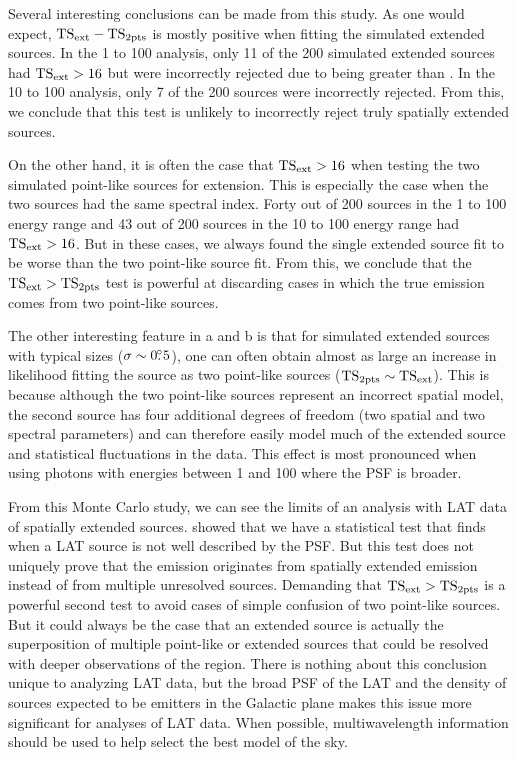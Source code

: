 Several interesting conclusions can be made from this study.  As one would
expect, $\mathrm{TS}_\mathrm{ext}-\mathrm{TS}_{\mathrm{2pts}}$ is mostly positive when fitting the simulated
extended sources.  In the 1 \gev to 100 \gev analysis, only 11 of the
200 simulated extended sources had $\mathrm{TS}_\mathrm{ext}>16$ but were incorrectly
rejected due to \tsinc being greater than \tsext.  In the 10 \gev to 100
\gev analysis, only 7 of the 200 sources were incorrectly rejected. From
this, we conclude that this test is unlikely to incorrectly reject truly
spatially extended sources.

On the other hand, it is often the case that $\mathrm{TS}_\mathrm{ext}>16$ when testing
the two simulated point-like sources for extension.  This is especially
the case when the two sources had the same spectral index. Forty out
of 200 sources in the 1 \gev to 100 \gev energy range and 43 out of
200 sources in the 10 \gev to 100 \gev energy range had $\mathrm{TS}_\mathrm{ext}>16$.
But in these cases, we always found the single extended source fit to
be worse than the two point-like source fit.  From this, we conclude
that the $\mathrm{TS}_\mathrm{ext}>\mathrm{TS}_{\mathrm{2pts}}$ test is powerful at discarding cases in which
the true emission comes from two point-like sources.

The other interesting feature in a
and b is that for simulated extended
sources with typical sizes ($\sigma\sim0\mbox{$.\!\!^\circ$}5$), one can often obtain
almost as large an increase in likelihood fitting the source as two
point-like sources ($\mathrm{TS}_{\mathrm{2pts}}\sim\mathrm{TS}_\mathrm{ext}$).  This is because although
the two point-like sources represent an incorrect spatial model, the
second source has four additional degrees of freedom (two spatial and
two spectral parameters) and can therefore easily model much of the
extended source and statistical fluctuations in the data.  This effect
is most pronounced when using photons with energies between 1 \gev and
100 \gev where the PSF is broader.

From this Monte Carlo study, we can see the limits of an analysis with LAT
data of spatially extended sources.  
showed that we have a statistical test that finds when a LAT source is
not well described by the PSF.  But this test does not uniquely prove
that the emission originates from spatially extended emission instead
of from multiple unresolved sources.  Demanding that $\mathrm{TS}_\mathrm{ext}>\mathrm{TS}_{\mathrm{2pts}}$
is a powerful second test to avoid cases of simple confusion of two
point-like sources. But it could always be the case that an extended
source is actually the superposition of multiple point-like or extended
sources that could be resolved with deeper observations of the region.
There is nothing about this conclusion unique to analyzing LAT data,
but the broad PSF of the LAT and the density of sources expected to be
\gev emitters in the Galactic plane makes this issue more significant
for analyses of LAT data.  When possible, multiwavelength information
should be used to help select the best model of the sky.

